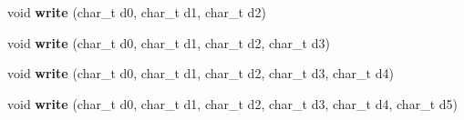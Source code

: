 \begin{DoxyCompactItemize}
\item 
\hypertarget{classxml__buffered__writer_af82b277c1ef5c75d1901bb5a8eb4507f}{void {\bfseries write} (char\+\_\+t d0, char\+\_\+t d1, char\+\_\+t d2)}\label{classxml__buffered__writer_af82b277c1ef5c75d1901bb5a8eb4507f}

\item 
\hypertarget{classxml__buffered__writer_af679f459dfa0af257c190b8db57e7dcb}{void {\bfseries write} (char\+\_\+t d0, char\+\_\+t d1, char\+\_\+t d2, char\+\_\+t d3)}\label{classxml__buffered__writer_af679f459dfa0af257c190b8db57e7dcb}

\item 
\hypertarget{classxml__buffered__writer_aad4a4f18223ec3cb1ff607425119b85f}{void {\bfseries write} (char\+\_\+t d0, char\+\_\+t d1, char\+\_\+t d2, char\+\_\+t d3, char\+\_\+t d4)}\label{classxml__buffered__writer_aad4a4f18223ec3cb1ff607425119b85f}

\item 
\hypertarget{classxml__buffered__writer_ae6af5067d768c24b9c20422f76737f29}{void {\bfseries write} (char\+\_\+t d0, char\+\_\+t d1, char\+\_\+t d2, char\+\_\+t d3, char\+\_\+t d4, char\+\_\+t d5)}\label{classxml__buffered__writer_ae6af5067d768c24b9c20422f76737f29}

\end{DoxyCompactItemize}
